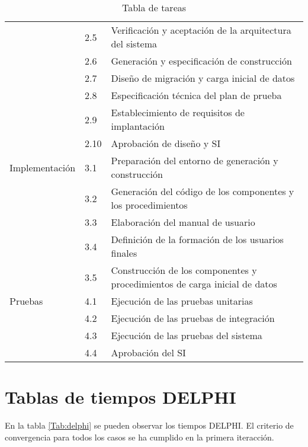 \documentclass[11pt,a4paper,spanish,twoside]{report}
\begin{document}
\begin{table}[!h]
\begin{tabular}{p{3cm}|p{3cm}|p{7cm}|}
    & 2.5 & Verificación y aceptación de la arquitectura del sistema\\
    \cline{2-3}
    & 2.6 & Generación y especificación de construcción\\
    \cline{2-3}
    & 2.7 & Diseño de migración y carga inicial de datos\\
    \cline{2-3}
    & 2.8 & Especificación técnica del plan de prueba\\
    \cline{2-3}
    & 2.9 & Establecimiento de requisitos de implantación\\
    \cline{2-3}
    & 2.10 & Aprobación de diseño y SI\\
    \hline
    Implementación & 3.1 & Preparación del entorno de generación y
    construcción\\
    \cline{2-3}
    & 3.2 & Generación del código de los componentes y los procedimientos\\
    \cline{2-3}
    & 3.3 & Elaboración del manual de usuario\\
    \cline{2-3}
    & 3.4 & Definición de la formación de los usuarios finales\\
    \cline{2-3}
    & 3.5 & Construcción de los componentes y procedimientos de carga inicial
    de datos \\
    \hline
    Pruebas & 4.1 & Ejecución de las pruebas unitarias\\
    \cline{2-3}
    & 4.2 & Ejecución de las pruebas de integración\\
    \cline{2-3}
    & 4.3 & Ejecución de las pruebas del sistema\\
    \cline{2-3}
    & 4.4 & Aprobación del SI\\
    \hline
  \end{tabular}
  \caption{Tabla de tareas} \label{Tab:tareas}
\end{table}

\section{Tablas de tiempos DELPHI}
En la tabla \ref{Tab:delphi} se pueden observar los tiempos DELPHI. El
criterio de convergencia para todos los casos se ha cumplido en la primera
iteracción.
\end{document}
